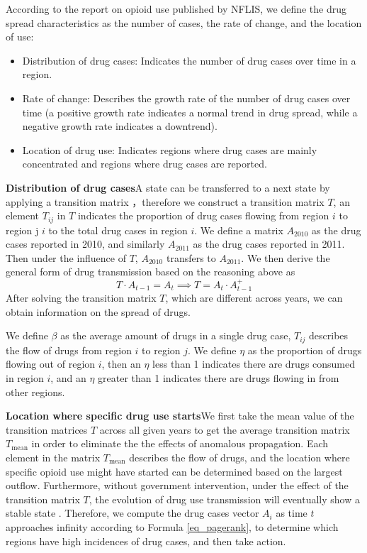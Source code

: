 \documentclass[13pt]{ctexart}
\begin{document}
According to the report on opioid use published by NFLIS\cite{characteristic}, we define the drug spread characteristics as the number of cases, the rate of change, and the location of use:

\begin{itemize}
	\item Distribution of drug cases: Indicates the number of drug cases over time in a region.
	\item Rate of change: Describes the growth rate of the number of drug cases over time (a positive growth rate indicates a normal trend in drug spread, while a negative growth rate indicates a downtrend).
	\item Location of drug use: Indicates regions where drug cases are mainly concentrated and regions where drug cases are reported.
\end{itemize}

\textbf{Distribution of drug cases}\quad A state can be transferred to a next state by applying a transition matrix \cite{pagerank}，therefore we construct a transition matrix $T$, an element $T_{ij}$ in $T$ indicates the proportion of drug cases flowing from region $i$ to region j $i$ to the total drug cases in region $i$. We define a matrix $A_{2010}$ as the drug cases reported in 2010, and similarly $A_{2011}$ as the drug cases reported in 2011. Then under the influence of $T$, $A_{2010}$ transfers to $A_{2011}$. We then derive the general form of drug transmission based on the reasoning above as
\begin{equation}
	T \cdot A_{t-1}=A_t \implies T=A_t \cdot A_{t-1}^{+}
	\label{eq_pagerank}
\end{equation}
After solving the transition matrix $T$, which are different across years, we can obtain information on the spread of drugs.

We define $\beta$ as the average amount of drugs in a single drug case, $T_{ij}$ describes the flow of drugs from region $i$ to region $j$. We define $\eta$ as the proportion of drugs flowing out of region $i$, then an $\eta$ less than 1 indicates there are drugs consumed in region $i$, and an $\eta$ greater than 1 indicates there are drugs flowing in from other regions.

\textbf{Location where specific drug use starts}\quad We first take the mean value of the transition matrices $T$ across all given years to get the average transition matrix $T_{\mathrm{mean}}$ in order to eliminate the the effects of anomalous propagation. Each element in the matrix $T_{\mathrm{mean}}$ describes the flow of drugs, and the location where specific opioid use might have started can be determined based on the largest outflow. Furthermore, without government intervention, under the effect of the transition matrix $T$, the evolution of drug use transmission will eventually show a stable state \cite{page_stable}. Therefore, we compute the drug cases vector $A_{i}$ as time $t$ approaches infinity according to Formula \ref{eq_pagerank}, to determine which regions have high incidences of drug cases, and then take action.
\end{document}
